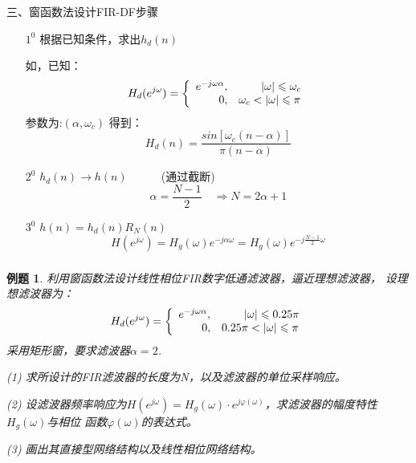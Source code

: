 \documentclass[notheorems,compress,mathserif,table]{beamer}
\newtheorem{example}{例题}
\begin{document}
\begin{frame}[allowframebreaks]\frametitle{}%
三、窗函数法设计FIR-DF步骤

\begin{enumerate}
  \item[$1^0$] 根据已知条件，求出$h_d(n)$
        \par 如，已知：
        $$
        H_d(e^{j\omega}) =
            \left\{\begin{array}
            {r@{,\quad}l}
               e^{-j\omega\alpha} & \quad\quad|\omega|\leqslant \omega_c\\
               0                  & \omega_c<|\omega|\leqslant \pi
            \end{array} \right.
        $$
        参数为:$(\alpha,\omega_c)$
        得到：
        $$H_d(n) = \frac{sin\left[\omega_c(n-\alpha)\right]}{\pi(n-\alpha)}$$
  \item[$2^0$] $h_d(n)\longrightarrow h(n)\quad\quad\quad$(通过截断)
               $$\alpha=\frac{N-1}{2}\quad \Longrightarrow N=2\alpha+1$$
  \item[$3^0$] $h(n) = h_d(n)R_N(n)$
               $$H(e^{j\omega}) = H_g(\omega)e^{-j\alpha\omega}
                 =H_g(\omega)e^{-j\frac{N-1}{2}\omega}$$
\end{enumerate}
\end{frame}


\begin{frame}\frametitle{}%
\begin{example}
     \par 利用窗函数法设计线性相位FIR数字低通滤波器，逼近理想滤波器，
     设理想滤波器为：
     $$
        H_d(e^{j\omega}) =
            \left\{\begin{array}
            {r@{,\quad}l}
               e^{-j\omega\alpha} & \quad\quad|\omega|\leqslant 0.25\pi\\
               0                  & 0.25\pi<|\omega|\leqslant \pi
            \end{array} \right.
        $$
     采用矩形窗，要求滤波器$\alpha = 2$.
     \par(1) 求所设计的FIR滤波器的长度为N，以及滤波器的单位采样响应。
     \par(2) 设滤波器频率响应为$H(e^{j\omega})=H_g(\omega)\cdot
             e^{j\varphi(\omega)}$，求滤波器的幅度特性$H_g(\omega)$与相位
             函数$\varphi(\omega)$的表达式。
     \par(3) 画出其直接型网络结构以及线性相位网络结构。
     \end{example}
\end{frame}
\end{document}
